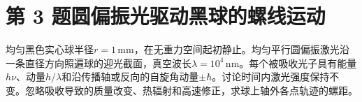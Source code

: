 \documentclass[UTF8,fontset=fandol,a4paper,11pt]{ctexart}
\begin{document}


\section*{第 3 题\quad 圆偏振光驱动黑球的螺线运动}\label{q:3}

均匀黑色实心球半径$r=1\,\mathrm{mm}$，在无重力空间起初静止。均匀平行圆偏振激光沿一条直径方向照遍球的迎光截面，真空波长$\lambda=10^4\,\mathrm{nm}$。每个被吸收光子具有能量$h\nu$、动量$h/\lambda$和沿传播轴或反向的自旋角动量$\pm\hbar$。讨论时间内激光强度保持不变。忽略吸收导致的质量改变、热辐射和高速修正，求球上轴外各点轨迹的螺距。

\begin{center}\begin{minipage}{.98\linewidth}\centering
{}
\end{minipage}
\end{center}
\end{document}
